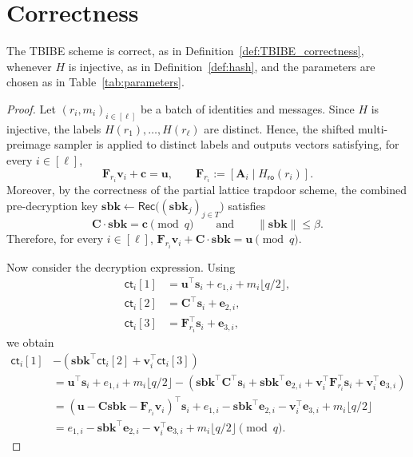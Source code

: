 \section{Correctness}
\begin{theorem}[Correctness]
The TBIBE scheme is correct, as in Definition~\ref{def:TBIBE_correctness},
whenever $H$ is injective, as in Definition~\ref{def:hash}, and the
parameters are chosen as in Table~\ref{tab:parameters}.
\end{theorem}
\begin{proof}
Let $(r_i,m_i)_{i\in[\ell]}$ be a batch of identities and messages.
Since $H$ is injective, the labels
$
    H(r_1),\ldots,H(r_\ell)
$
are distinct. Hence, the shifted multi-preimage sampler is applied to
distinct labels and outputs vectors satisfying, for every $i\in[\ell]$,
\[
    \mathbf{F}_{r_i}\mathbf{v}_i+\mathbf{c}=\mathbf{u},
    \qquad
    \mathbf{F}_{r_i}:=
    [\mathbf{A}_i \mid H_{\mathsf{ro}}(r_i)].
\]
Moreover, by the correctness of the partial lattice trapdoor scheme,
the combined pre-decryption key
$
    \mathbf{sbk}
    \leftarrow
    \mathsf{Rec}\big((\mathbf{sbk}_j)_{j\in T}\big)
$
satisfies
\[
    \mathbf{C}\cdot\mathbf{sbk}=\mathbf{c}
    \pmod q
    \qquad\text{and}\qquad
    \|\mathbf{sbk}\|\le \beta .
\]
Therefore, for every $i\in[\ell]$,
$
    \mathbf{F}_{r_i}\mathbf{v}_i+\mathbf{C}\cdot\mathbf{sbk}
    =
    \mathbf{u}
    \pmod q .
$

Now consider the decryption expression. Using
\[
\begin{aligned}
    \mathsf{ct}_i[1]
    &=
    \mathbf{u}^{\top}\mathbf{s}_i
    +
    e_{1,i}
    +
    m_i\lfloor q/2\rfloor,\\
    \mathsf{ct}_i[2]
    &=
    \mathbf{C}^{\top}\mathbf{s}_i
    +
    \mathbf{e}_{2,i},\\
    \mathsf{ct}_i[3]
    &=
    \mathbf{F}_{r_i}^{\top}\mathbf{s}_i
    +
    \mathbf{e}_{3,i},
\end{aligned}
\]
we obtain
\[
\begin{aligned}
    \mathsf{ct}_i[1]
    &-
    \left(
        \mathbf{sbk}^{\top}\mathsf{ct}_i[2]
        +
        \mathbf{v}_i^{\top}\mathsf{ct}_i[3]
    \right)
    \\
    &=
    \mathbf{u}^{\top}\mathbf{s}_i
    +
    e_{1,i}
    +
    m_i\lfloor q/2\rfloor
    -
    \left(
        \mathbf{sbk}^{\top}\mathbf{C}^{\top}\mathbf{s}_i
        +
        \mathbf{sbk}^{\top}\mathbf{e}_{2,i}
        +
        \mathbf{v}_i^{\top}\mathbf{F}_{r_i}^{\top}\mathbf{s}_i
        +
        \mathbf{v}_i^{\top}\mathbf{e}_{3,i}
    \right)
    \\
    &=
    \left(
        \mathbf{u}
        -
        \mathbf{C}\mathbf{sbk}
        -
        \mathbf{F}_{r_i}\mathbf{v}_i
    \right)^{\top}
    \mathbf{s}_i
    +
    e_{1,i}
    -
    \mathbf{sbk}^{\top}\mathbf{e}_{2,i}
    -
    \mathbf{v}_i^{\top}\mathbf{e}_{3,i}
    +
    m_i\lfloor q/2\rfloor
    \\
    &=
    e_{1,i}
    -
    \mathbf{sbk}^{\top}\mathbf{e}_{2,i}
    -
    \mathbf{v}_i^{\top}\mathbf{e}_{3,i}
    +
    m_i\lfloor q/2\rfloor
    \pmod q .
\end{aligned}
\]


\end{proof}
